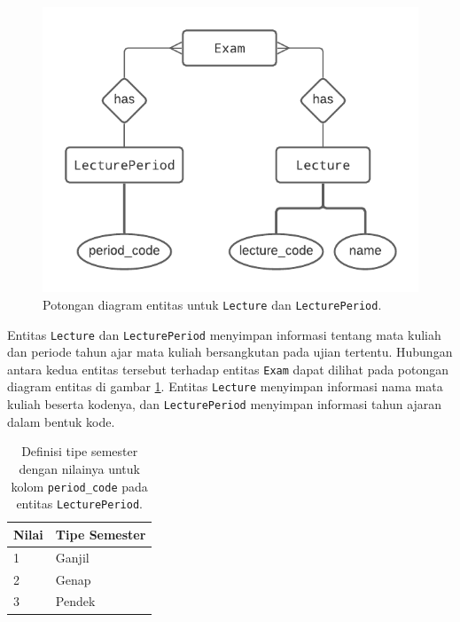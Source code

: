     \begin{figure}
        \centering
        \includegraphics{Gambar/erd-details/ERD--New - Lecture & LecturePeriod.pdf}
        \caption{Potongan diagram entitas untuk \texttt{Lecture} dan
        \texttt{LecturePeriod}.}
        \label{fig:erd_lecture-lectureperiod}
    \end{figure}

    Entitas \texttt{Lecture} dan \texttt{LecturePeriod} menyimpan informasi
    tentang mata kuliah dan periode tahun ajar mata kuliah bersangkutan pada
    ujian tertentu. Hubungan antara kedua entitas tersebut terhadap entitas
    \texttt{Exam} dapat dilihat pada potongan diagram entitas di gambar
    \ref{fig:erd_lecture-lectureperiod}.  Entitas \texttt{Lecture} menyimpan
    informasi nama mata kuliah beserta kodenya, dan \texttt{LecturePeriod}
    menyimpan informasi tahun ajaran dalam bentuk kode.
    
    \begin{table}[]
        \centering
        \begin{tabular}{|l|l|}
        \hline
        Nilai & Tipe Semester \\ \hline
        1     & Ganjil        \\ \hline
        2     & Genap         \\ \hline
        3     & Pendek        \\ \hline
        \end{tabular}
        \caption{Definisi tipe semester dengan nilainya untuk kolom
            \texttt{period\_code} pada entitas \texttt{LecturePeriod}.}
        \label{tab:lecture-periode}
    \end{table}
    
